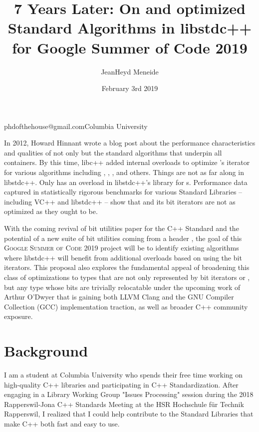 \documentclass{wg21}
\begin{document}
\title{7 Years Later: On  and optimized Standard Algorithms in libstdc++ for Google Summer of Code 2019}
\author{JeanHeyd Meneide}{phdofthehouse@gmail.com}{Columbia University}
\date{February 3rd 2019}

\maketitle

In 2012, Howard Hinnant wrote a blog post about the performance characteristics and qualities of not only  but the standard algorithms that underpin all containers\cite{hinnant_on_vector_bool}. By this time, libc++ added internal overloads to optimize 's iterator for various algorithms\cite{libc++_bit_iterator} including , , ,  and others. Things are not as far along in libstdc++. Only \cite{libstdc++_bit_iterator} has an overload in libstdc++'s library for s. Performance data captured in statistically rigorous benchmarks for various Standard Libraries -- including VC++ and libstdc++ -- show that  and its bit iterators are not as optimized as they ought to be\cite{bit_proposal_gsoc2019}.

With the coming revival of bit utilities paper for the C++ Standard and the potential of a new suite of bit utilities coming from a header \cite{p0237}, the goal of this \textsc{Google Summer of Code 2019} project will be to identify existing algorithms where libstdc++ will benefit from additional overloads based on using the bit iterators. This proposal also explores the fundamental appeal of broadening this class of optimizations to types that are not only represented by bit iterators or , but any type whose bits are trivially relocatable under the upcoming work of Arthur O'Dwyer that is gaining both LLVM Clang\cite{relocatable_clang} and the GNU Compiler Collection (GCC)\cite{relocatable_gcc} implementation traction, as well as broader C++ community exposure\cite{odwyer_cppchat}.


\section[background]{Background}

I am a student at Columbia University who spends their free time working on high-quality C++ libraries\cite{sol2} and participating in C++ Standardization\cite{c++_standardization}. After engaging in a Library Working Group "Issues Processing" session during the 2018 Rapperswil-Jona C++ Standards Meeting\cite{c++_rapperswil_2018} at the HSR Hochschule für Technik Rapperswil, I realized that I could help contribute to the Standard Libraries that make C++ both fast and easy to use.
\end{document}
